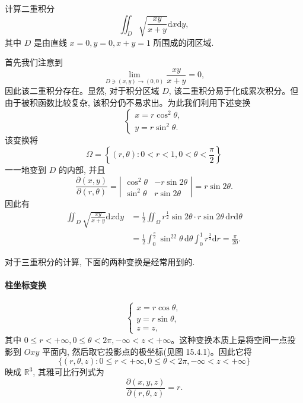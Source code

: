 \begin{example}\label{example:ma-15-4-5}
计算二重积分
\[
  \iint_D\sqrt{\frac{xy}{x+y}}\mathrm dx\mathrm dy,
\]
其中 $D$ 是由直线 $x=0,y=0,x+y=1$ 所围成的闭区域.
\end{example}


\begin{solve}
首先我们注意到
\[
  \lim_{D\ni(x,y)\to(0,0)}\frac{xy}{x+y}=0,
\]
因此该二重积分存在。显然, 对于积分区域 $D$, 该二重积分易于化成累次积分。但由于被积函数比较复杂, 该积分仍不易求出。为此我们利用下述变换
\[
  \begin{cases}
    x=r\cos^2\theta,\\
    y=r\sin^2\theta.
  \end{cases}
\]
该变换将
\[
  \Omega=\left\{(r,\theta):0<r<1,0<\theta<\frac\pi2\right\}
\]
一一地变到 $D$ 的内部, 并且
\[
  \frac{\partial(x,y)}{\partial(r,\theta)}
  =\left|\begin{matrix}
    \cos^2\theta&-r\sin2\theta\\
    \sin^2\theta&r\sin2\theta
  \end{matrix}\right|
  =r\sin2\theta.
\]
因此有
\[
\begin{aligned}
  \iint_D\sqrt{\frac{xy}{x+y}}\mathrm dx\mathrm dy
  &=\frac12\iint_\Omega r^{\frac12}\sin2\theta\cdot r\sin2\theta\,\mathrm dr\mathrm d\theta\\
  &=\frac12\int_0^{\frac\pi2}\sin^22\theta\,\mathrm d\theta\int_0^1 r^{\frac32}\mathrm dr
  =\frac\pi{20}.
\end{aligned}
\]

对于三重积分的计算, 下面的两种变换是经常用到的.
\end{solve}


\paragraph*{柱坐标变换}

\[
  \begin{cases}
    x=r\cos\theta,\\
    y=r\sin\theta,\\
    z=z,
  \end{cases}
\]
其中 $0\leqslant r<+\infty,0\leqslant\theta<2\pi,-\infty<z<+\infty$。这种变换本质上是将空间一点投影到 $Oxy$ 平面内, 然后取它投影点的极坐标(见图 15.4.1)。因此它将
\[
  \{(r,\theta,z):0\leqslant r<+\infty,0\leqslant\theta<2\pi,-\infty<z<+\infty\}
\]
映成 $\mathbb R^3$, 其雅可比行列式为
\[
  \frac{\partial(x,y,z)}{\partial(r,\theta,z)}=r.
\]

